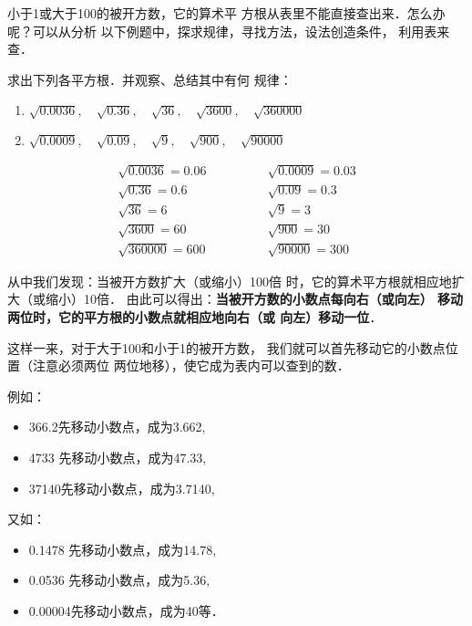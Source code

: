 小于1或大于100的被开方数，它的算术平
方根从表里不能直接查出来．怎么办呢？可以从分析
以下例题中，探求规律，寻找方法，设法创造条件，
利用表来查．


\begin{example}
    求出下列各平方根．并观察、总结其中有何
规律：
\begin{enumerate}
    \item $\sqrt{0.0036},\quad \sqrt{0.36},\quad \sqrt{36},\quad \sqrt{3600},\quad \sqrt{360000}$
    \item $\sqrt{0.0009},\quad \sqrt{0.09},\quad \sqrt{9},\quad \sqrt{900},\quad \sqrt{90000} $
\end{enumerate}
\end{example}

\begin{solution}
\[\begin{array}{ll}
    \sqrt{0.0036}=0.06\qquad \qquad  &  \sqrt{0.0009}=0.03 \\
     \sqrt{0.36}=0.6 &  \sqrt{0.09}=0.3\\
      \sqrt{36}=6 & \sqrt{9}=3 \\
      \sqrt{3600}=60 &  \sqrt{900}=30 \\
       \sqrt{360000}=600 &  \sqrt{90000} =300
\end{array}\]
\end{solution}

从中我们发现：当被开方数扩大（或缩小）100倍
时，它的算术平方根就相应地扩大（或缩小）10倍．
由此可以得出：\textbf{当被开方数的小数点每向右（或向左）
移动两位时，它的平方根的小数点就相应地向右（或
向左）移动一位}．

这样一来，对于大于100和小于1的被开方数，
我们就可以首先移动它的小数点位置（注意必须两位
两位地移），使它成为表内可以查到的数．

例如：
\begin{itemize}
    \item 366.2先移动小数点，成为3.662,
    \item 4733 先移动小数点，成为47.33,
    \item 37140先移动小数点，成为3.7140,
\end{itemize}

又如：
\begin{itemize}
    \item 0.1478 先移动小数点，成为14.78,
    \item 0.0536 先移动小数点，成为5.36,
    \item 0.00004先移动小数点，成为40等．
\end{itemize}

